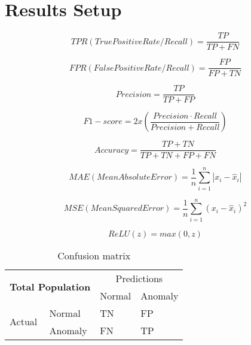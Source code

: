 \section{Results Setup}

\begin{equation}
    TPR(TruePositiveRate/Recall) = \frac{TP}{TP + FN}
\end{equation}

\begin{equation}
    FPR(FalsePositiveRate/Recall) = \frac{FP}{FP + TN}
\end{equation}

\begin{equation}
    Precision = \frac{TP}{TP + FP}
\end{equation}

\begin{equation}
    F1 - score = 2 x (\frac{Precision \cdot Recall}{Precision + Recall})
\end{equation}

\begin{equation}
    Accuracy = \frac{TP + TN}{TP + TN + FP + FN}
\end{equation}

\begin{equation}
    MAE(Mean Absolute Error) = \dfrac{1}{n}  \sum_{i=1}^{n}|x_i-\hat{x}_i|
\end{equation}

\begin{equation}
    MSE(Mean Squared Error) = \dfrac{1}{n}  \sum_{i=1}^{n}(x_i-\hat{x}_i)^2
\end{equation}

\begin{equation}
    ReLU(z) = max(0, z)
\end{equation}


\begin{table}[h]
\centering
\begin{tabular}{|ll|ll|}
\hline
\multicolumn{2}{|c|}{\multirow{2}{*}{\textbf{Total Population}}} & \multicolumn{2}{c|}{Predictions}      \\ \cline{3-4} 
\multicolumn{2}{|c|}{}                                           & \multicolumn{1}{l|}{Normal} & Anomaly \\ \hline
\multicolumn{1}{|l|}{\multirow{2}{*}{Actual}}      & Normal      & \multicolumn{1}{l|}{TN}     & FP      \\ \cline{2-4} 
\multicolumn{1}{|l|}{}                             & Anomaly     & \multicolumn{1}{l|}{FN}     & TP      \\ \hline
\end{tabular}
\label{tab:confmat}
\caption{Confusion matrix}
\end{table}


